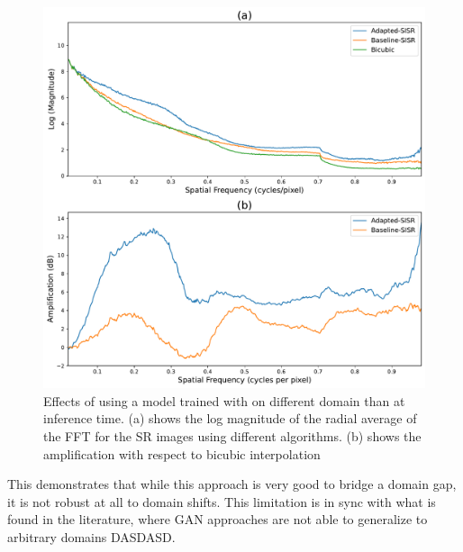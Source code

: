         \begin{figure}[H]
            \centering
            \includegraphics[scale=0.4]{Includes/5-target-prediction-with-domain-gap-fft.pdf}
            \caption{Effects of using a model trained with on different domain than at inference time. 
                     (a) shows the log magnitude of the radial average of the FFT for the SR images using different algorithms.
                     (b) shows the amplification with respect to bicubic interpolation
                     }
            \label{fig:5-target-prediction-with-domain-gap-fft}
        \end{figure}

        
        
    This demonstrates that while this approach is very good to bridge a domain gap, it is not robust at all to domain shifts. 
    This limitation is in sync with what is found in the literature, where GAN approaches are not able to generalize to arbitrary domains DASDASD.


